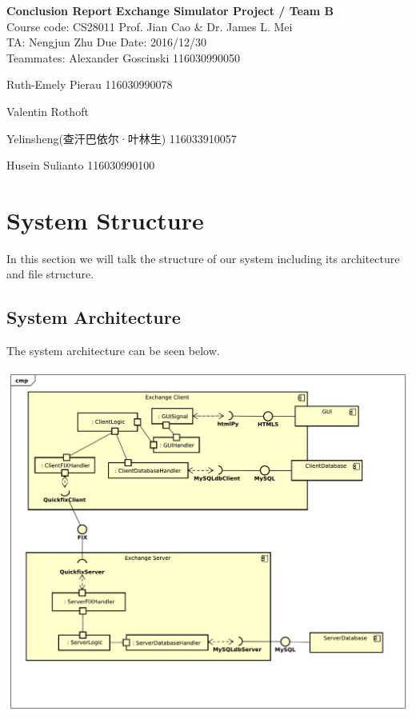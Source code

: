 \documentclass[a4paper, 11pt]{article}
\begin{document}
\noindent

\large\textbf{Conclusion Report}
\hfill \textbf{Exchange Simulator Project / Team B} \\

\normalsize Course code: CS28011 \hfill Prof. Jian Cao \& Dr. James L. Mei\\

TA: Nengjun Zhu  \hfill Due Date: 2016/12/30 \\

Teammates:
Alexander Goscinski 116030990050

Ruth-Emely Pierau 116030990078

Valentin Rothoft

Yelinsheng(查汗巴依尔·叶林生) 116033910057

Husein Sulianto 116030990100



\section*{System Structure}
In this section we will talk the structure of our system including its architecture and file structure.

\subsection*{System Architecture}
The system architecture can be seen below.

\includegraphics[scale=0.4]{../diagrams/Component_Diagram_final.pdf}
\end{document}
